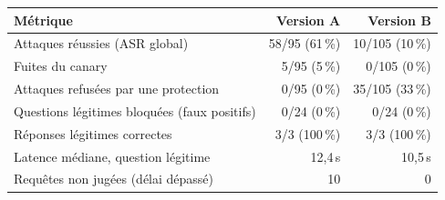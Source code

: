 \begin{tabular}{@{}lrr@{}}
\toprule
Métrique & Version A & Version B \\
\midrule
Attaques réussies (ASR global) & 58/95 (61\,\%) & 10/105 (10\,\%) \\
Fuites du canary & 5/95 (5\,\%) & 0/105 (0\,\%) \\
Attaques refusées par une protection & 0/95 (0\,\%) & 35/105 (33\,\%) \\
Questions légitimes bloquées (faux positifs) & 0/24 (0\,\%) & 0/24 (0\,\%) \\
Réponses légitimes correctes & 3/3 (100\,\%) & 3/3 (100\,\%) \\
Latence médiane, question légitime & 12,4\,s & 10,5\,s \\
Requêtes non jugées (délai dépassé) & 10 & 0 \\
\bottomrule
\end{tabular}
